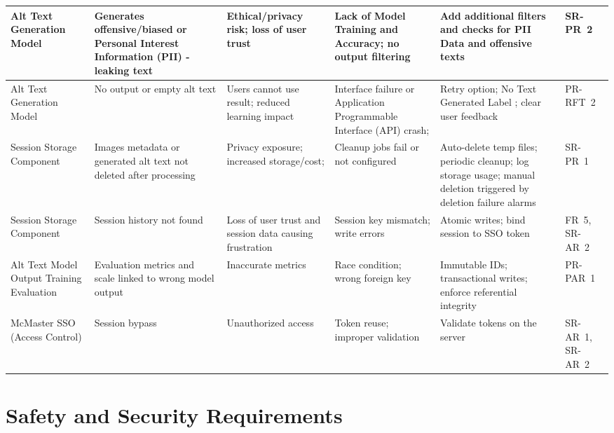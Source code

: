 \documentclass{article}
\begin{document}
\begin{landscape}
\begin{longtable}{|p{2.0cm}|p{3.0cm}|p{3.2cm}|p{3.2cm}|p{4.0cm}|p{2.6cm}|}
    Alt Text Generation Model &
    Generates offensive/biased or Personal Interest Information (PII) -leaking text &
    Ethical/privacy risk; loss of user trust &
    Lack of Model Training and Accuracy; no output filtering &
    Add additional filters and checks for PII Data and offensive texts &
    SR-PR~2 \\ \hline
    
    Alt Text Generation Model &
    No output or empty alt text &
    Users cannot use result; reduced learning impact &
    Interface failure or Application Programmable Interface (API) crash;  &
    Retry option; No Text Generated Label ; clear user feedback &
    PR-RFT~2 \\ \hline
    
    Session Storage Component &
    Images metadata or generated alt text not deleted after processing &
    Privacy exposure; increased storage/cost;  &
    Cleanup jobs fail or not configured &
    Auto-delete temp files; periodic cleanup; log storage usage; manual deletion triggered by deletion failure alarms &
    SR-PR~1 \\ \hline
    
    Session Storage Component &
    Session history not found &
    Loss of user trust and session data causing frustration &
    Session key mismatch; write errors &
    Atomic writes; bind session to SSO token &
    FR~5, SR-AR~2 \\ \hline
    
    Alt Text Model Output Training Evaluation &
    Evaluation metrics and scale linked to wrong model output &
    Inaccurate metrics &
    Race condition; wrong foreign key &
    Immutable IDs; transactional writes; enforce referential integrity &
    PR-PAR~1 \\ \hline
    
    McMaster SSO (Access Control) &
    Session bypass &
    Unauthorized access &
    Token reuse; improper validation &
    Validate tokens on the server &
    SR-AR~1, SR-AR~2 \\ \hline
    
    \end{longtable}
    
    \end{landscape}

    
    
\section{Safety and Security Requirements}
\end{document}
